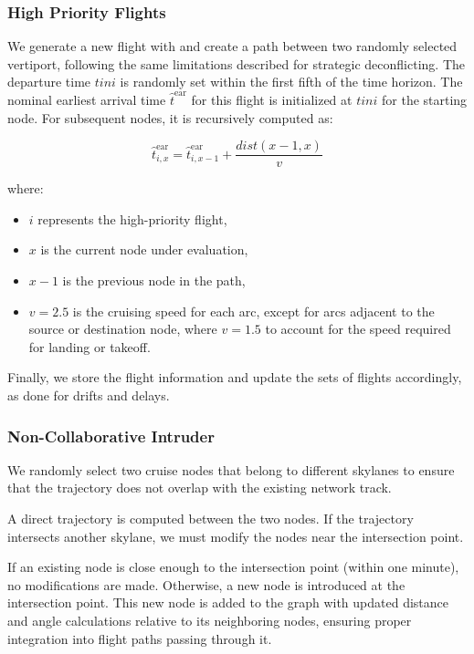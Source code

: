 \documentclass[../../thesis.tex]{subfiles}
\begin{document}
\subsubsection{High Priority Flights}  
We generate a new flight with 
and create a path between two randomly selected vertiport, following the same limitations described for strategic deconflicting.  
The departure time \( tini \) is randomly set within the first fifth of the time horizon. The nominal earliest arrival time \( \hat{t}^\text{ear} \) for this flight is initialized at \( tini \) for the starting node. For subsequent nodes, it is recursively computed as:  

\[
\hat{t}^\text{ear}_{i,x} = \hat{t}^\text{ear}_{i,x-1} + \frac{dist(x-1,x)}{v}
\]

where:  
\begin{itemize}
    \item \( i \) represents the high-priority flight,  
    \item \( x \) is the current node under evaluation,  
    \item \( x-1 \) is the previous node in the path,  
    \item \( v = 2.5 \) is the cruising speed for each arc, except for arcs adjacent to the source or destination node, where \( v = 1.5 \) to account for the speed required for landing or takeoff.  
\end{itemize}

Finally, we store the flight information and update the sets of flights accordingly, as done for drifts and delays.

\subsubsection{Non-Collaborative Intruder}  
We randomly select two cruise nodes that belong to different skylanes to ensure that the trajectory does not overlap with the existing network track.

A direct trajectory is computed between the two nodes. If the trajectory intersects another skylane, we must modify the nodes near the intersection point.  

If an existing node is close enough to the intersection point (within one minute), no modifications are made. Otherwise, a new node is introduced at the intersection point.  
This new node is added to the graph with updated distance and angle calculations relative to its neighboring nodes, ensuring proper integration into flight paths passing through it.  
\end{document}

